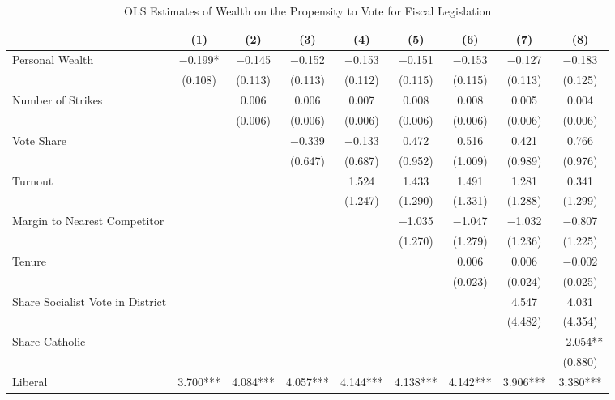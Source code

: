 \begin{table}

\caption{\label{tab:ols_controls}OLS Estimates of Wealth on the Propensity to Vote for Fiscal Legislation}
\centering
\begin{tabular}[t]{lcccccccc}
\toprule
  & (1) & (2) & (3) & (4) & (5) & (6) & (7) & (8)\\
\midrule
Personal Wealth & \num{-0.199}* & \num{-0.145} & \num{-0.152} & \num{-0.153} & \num{-0.151} & \num{-0.153} & \num{-0.127} & \num{-0.183}\\
 & (\num{0.108}) & (\num{0.113}) & (\num{0.113}) & (\num{0.112}) & (\num{0.115}) & (\num{0.115}) & (\num{0.113}) & (\num{0.125})\\
Number of Strikes &  & \num{0.006} & \num{0.006} & \num{0.007} & \num{0.008} & \num{0.008} & \num{0.005} & \num{0.004}\\
 &  & (\num{0.006}) & (\num{0.006}) & (\num{0.006}) & (\num{0.006}) & (\num{0.006}) & (\num{0.006}) & (\num{0.006})\\
Vote Share &  &  & \num{-0.339} & \num{-0.133} & \num{0.472} & \num{0.516} & \num{0.421} & \num{0.766}\\
 &  &  & (\num{0.647}) & (\num{0.687}) & (\num{0.952}) & (\num{1.009}) & (\num{0.989}) & (\num{0.976})\\
Turnout &  &  &  & \num{1.524} & \num{1.433} & \num{1.491} & \num{1.281} & \num{0.341}\\
 &  &  &  & (\num{1.247}) & (\num{1.290}) & (\num{1.331}) & (\num{1.288}) & (\num{1.299})\\
Margin to Nearest Competitor &  &  &  &  & \num{-1.035} & \num{-1.047} & \num{-1.032} & \num{-0.807}\\
 &  &  &  &  & (\num{1.270}) & (\num{1.279}) & (\num{1.236}) & (\num{1.225})\\
Tenure &  &  &  &  &  & \num{0.006} & \num{0.006} & \num{-0.002}\\
 &  &  &  &  &  & (\num{0.023}) & (\num{0.024}) & (\num{0.025})\\
Share Socialist Vote in District &  &  &  &  &  &  & \num{4.547} & \num{4.031}\\
 &  &  &  &  &  &  & (\num{4.482}) & (\num{4.354})\\
Share Catholic &  &  &  &  &  &  &  & \num{-2.054}**\\
 &  &  &  &  &  &  &  & (\num{0.880})\\
Liberal & \num{3.700}*** & \num{4.084}*** & \num{4.057}*** & \num{4.144}*** & \num{4.138}*** & \num{4.142}*** & \num{3.906}*** & \num{3.380}***\\

\end{tabular}
\end{table}
